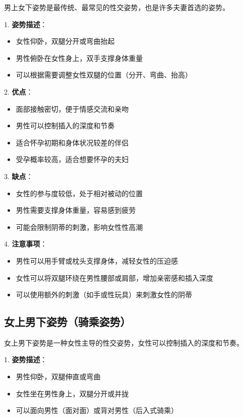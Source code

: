 \documentclass[12pt,UTF8]{ctexbook}
\begin{document}
男上女下姿势是最传统、最常见的性交姿势，也是许多夫妻首选的姿势。

1. \textbf{姿势描述}：
  \begin{itemize}
  \item 女性仰卧，双腿分开或弯曲抬起
  \item 男性俯卧在女性身上，双手支撑身体重量
  \item 可以根据需要调整女性双腿的位置（分开、弯曲、抬高）
  \end{itemize}

2. \textbf{优点}：
  \begin{itemize}
  \item 面部接触密切，便于情感交流和亲吻
  \item 男性可以控制插入的深度和节奏
  \item 适合怀孕初期和身体状况较差的伴侣
  \item 受孕概率较高，适合想要怀孕的夫妇
  \end{itemize}

3. \textbf{缺点}：
  \begin{itemize}
  \item 女性的参与度较低，处于相对被动的位置
  \item 男性需要支撑身体重量，容易感到疲劳
  \item 可能会限制阴蒂的刺激，影响女性性高潮
  \end{itemize}

4. \textbf{注意事项}：
  \begin{itemize}
  \item 男性可以用手臂或枕头支撑身体，减轻女性的压迫感
  \item 女性可以将双腿环绕在男性腰部或肩部，增加亲密感和插入深度
  \item 可以使用额外的刺激（如手或性玩具）来刺激女性的阴蒂
  \end{itemize}

\subsection{女上男下姿势（骑乘姿势）}

女上男下姿势是一种女性主导的性交姿势，女性可以控制插入的深度和节奏。

1. \textbf{姿势描述}：
  \begin{itemize}
  \item 男性仰卧，双腿伸直或弯曲
  \item 女性坐在男性身上，双腿分开或并拢
  \item 可以面向男性（面对面）或背对男性（后入式骑乘）
  \end{itemize}
\end{document}
